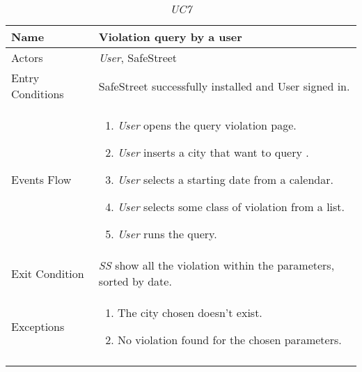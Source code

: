 \documentclass[../../../RASD.tex]{subfiles}
\begin{document}
    \begin{center}
        \begin{longtable}{| p{.35\linewidth} | p{.65\linewidth} |}
            \hline
            \textbf{Name} & \textbf{Violation query by a user}\\ \hline
            Actors & \textit{User}, SafeStreet\\ \hline
            Entry Conditions & SafeStreet successfully installed and User signed in.\\ \hline
            Events Flow &
            \begin{enumerate}
                \item \textit{User} opens the query violation page.
                \item \textit{User} inserts a city that want to query .
                \item \textit{User} selects a starting date from a calendar.
                \item \textit{User} selects some class of violation from a list.
                \item \textit{User} runs the query.
            \end{enumerate}
            \\ \hline
            Exit Condition & \textit{SS} show all the violation within the parameters, sorted by date.\\ \hline
            Exceptions &
            \begin{enumerate}
                \item The city chosen doesn’t exist.
                \item No violation found for the chosen parameters.
            \end{enumerate}
            \\
            \hline
            \caption[\textit{Use Case 7}]{\textit{UC7}}
        \end{longtable}
    \end{center}
    \newpage
\end{document}
